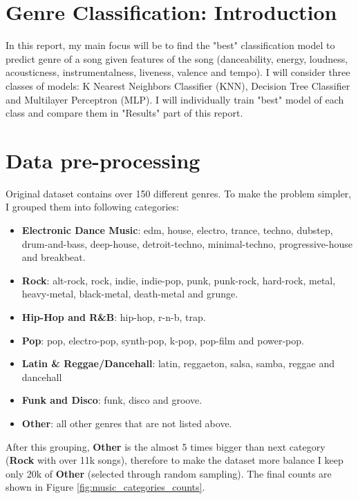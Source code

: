 \documentclass{assignment}
\date{\today}                                   %
\begin{document}
\section{Genre Classification: Introduction}

In this report, my main focus will be to find the "best" classification model to predict genre of a song given features of the song (danceability, energy, loudness, acousticness, instrumentalness, liveness, valence and tempo). I will consider three classes of models: K Nearest Neighbors Classifier (KNN), Decision Tree Classifier and Multilayer Perceptron (MLP). I will individually train "best" model of each class and compare them in "Results" part of this report.

\section{Data pre-processing}

Original dataset contains over 150 different genres. To make the problem simpler, I grouped them into following categories:
\begin{itemize}
    \item \textbf{Electronic Dance Music}: edm, house, electro, trance, techno, dubstep, drum-and-bass, deep-house, detroit-techno, minimal-techno, progressive-house and breakbeat.

    \item \textbf{Rock}: alt-rock, rock, indie, indie-pop, punk, punk-rock, hard-rock, metal, heavy-metal, black-metal, death-metal and grunge.

    \item \textbf{Hip-Hop and R\&B}: hip-hop, r-n-b, trap.

    \item \textbf{Pop}: pop, electro-pop, synth-pop, k-pop, pop-film and power-pop.

    \item \textbf{Latin \& Reggae/Dancehall}: latin, reggaeton, salsa, samba, reggae and dancehall

    \item \textbf{Funk and Disco}: funk, disco and groove.

    \item \textbf{Other}: all other genres that are not listed above.
\end{itemize}

After this grouping, \textbf{Other} is the almost 5 times bigger than next category (\textbf{Rock} with over 11k songs), therefore to make the dataset more balance I keep only 20k of \textbf{Other} (selected through random sampling). The final counts are shown in Figure \ref{fig:music_categories_counts}.
\end{document}
